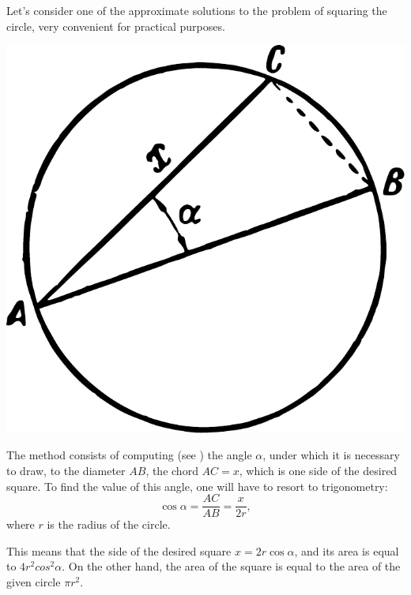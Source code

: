 Let's consider one of the approximate solutions to the problem of squaring the circle, very convenient for practical purposes.

\begin{marginfigure}
\centering
\includegraphics[width=\textwidth]{figures/ch-09/fig-126.pdf}
\end{marginfigure}


The method consists of computing (see ) the angle $\alpha$, under which it is necessary to draw, to the diameter $AB$, the chord $AC = x$, which is one side of the desired square. To find the value of this angle, one will have to resort to trigonometry:
\begin{equation*}%
\cos \alpha = \frac{AC}{AB} = \frac{x}{2r},
\end{equation*}
where $r$ is the radius of the circle.

This means that the side of the desired square $x = 2r \cos \alpha$, and its area is equal to $4r^{2} cos^{2} \alpha$. On the other hand, the area of the square is equal to the area of the given circle $\pi r^{2}$.

